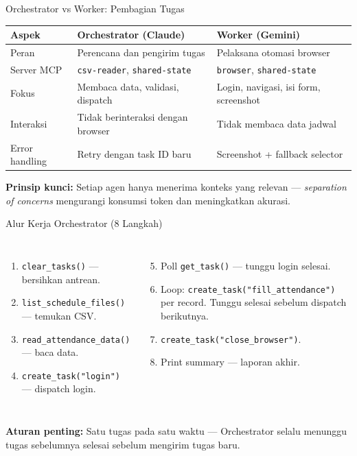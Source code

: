 \documentclass[aspectratio=169, table]{beamer}
\begin{document}
\begin{frame}{Orchestrator vs Worker: Pembagian Tugas}
\vspace{4pt}
\centering
\scriptsize
\begin{tabular}{|>{\raggedright\arraybackslash}p{}|>{\raggedright\arraybackslash}p{}|>{\raggedright\arraybackslash}p{}|}
\hline
\rowcolor{blue!12}
\textbf{Aspek} & \textbf{Orchestrator (Claude)} & \textbf{Worker (Gemini)} \\
\hline
Peran & Perencana dan pengirim tugas & Pelaksana otomasi browser \\
\hline
Server MCP & \texttt{csv-reader}, \texttt{shared-state} & \texttt{browser}, \texttt{shared-state} \\
\hline
Fokus & Membaca data, validasi, dispatch & Login, navigasi, isi form, screenshot \\
\hline
Interaksi & Tidak berinteraksi dengan browser & Tidak membaca data jadwal \\
\hline
Error handling & Retry dengan task ID baru & Screenshot + fallback selector \\
\hline
\end{tabular}

\vspace{8pt}
\small
\textbf{Prinsip kunci:} Setiap agen hanya menerima konteks yang relevan --- \textit{separation of concerns} mengurangi konsumsi token dan meningkatkan akurasi.
\end{frame}

\begin{frame}{Alur Kerja Orchestrator (8 Langkah)}
\vspace{6pt}
\begin{columns}[T]
\begin{enumerate}
  \item \texttt{clear\_tasks()} --- bersihkan antrean.
  \item \texttt{list\_schedule\_files()} --- temukan CSV.
  \item \texttt{read\_attendance\_data()} --- baca data.
  \item \texttt{create\_task("login")} --- dispatch login.
\end{enumerate}

\begin{enumerate}
  \setcounter{enumi}{4}
  \item Poll \texttt{get\_task()} --- tunggu login selesai.
  \item Loop: \texttt{create\_task("fill\_attendance")} per record. Tunggu selesai sebelum dispatch berikutnya.
  \item \texttt{create\_task("close\_browser")}.
  \item Print summary --- laporan akhir.
\end{enumerate}
\end{columns}

\vspace{8pt}
\small
\textbf{Aturan penting:} Satu tugas pada satu waktu --- Orchestrator selalu menunggu tugas sebelumnya selesai sebelum mengirim tugas baru.
\end{frame}
\end{document}
